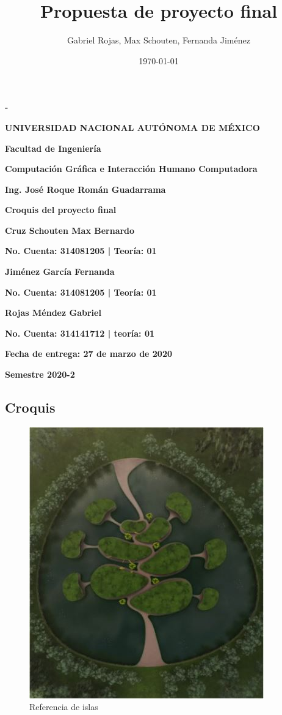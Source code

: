 \documentclass[12pt]{article} %
\title{Propuesta de proyecto final}
\author{Gabriel Rojas, Max Schouten, Fernanda Jiménez}
\date{\today}
\begin{document}
	\begin{titlepage}
		\thispagestyle{fancy}
		\centering
		{\bfseries - \par}
		\vspace{0.7cm}
		{\bfseries\LARGE UNIVERSIDAD NACIONAL AUTÓNOMA DE MÉXICO \par}
		\vspace{0.7cm}
		{\bfseries\LARGE Facultad de Ingeniería \par}
		\vspace{1cm}
		{\bfseries\LARGE Computación Gráfica e Interacción Humano Computadora \par}
		\vspace{0.5cm}
		{\bfseries\LARGE Ing. José Roque Román Guadarrama \par}
		\vspace{0.5cm}
		{\bfseries\LARGE Croquis del proyecto final \par}
		\vspace{0.5cm}
		{\bfseries\LARGE Cruz Schouten Max Bernardo \par}
		{\bfseries\Large No. Cuenta: 314081205 | Teoría: 01\par}
		{\bfseries\LARGE Jiménez García Fernanda \par}
		{\bfseries\Large No. Cuenta: 314081205 | Teoría: 01\par}
		{\bfseries\LARGE Rojas Méndez Gabriel \par}
		{\bfseries\Large No. Cuenta: 314141712 | teoría: 01\par}
		\vspace{1cm}
		{\bfseries\LARGE Fecha de entrega: 27 de marzo de 2020 \par}
		\vspace{1cm}
		{\bfseries\LARGE Semestre 2020-2 \par}
	\end{titlepage}
	
	\newpage
	\begin{landscape}
		\section{Croquis}
		\begin{figure}[h]
			\begin{center}
				\includegraphics[scale=0.5]{images/Isla.JPG}
				\caption{Referencia de islas}
			\end{center}  		
		\end{figure}
	\end{landscape}
\end{document}

